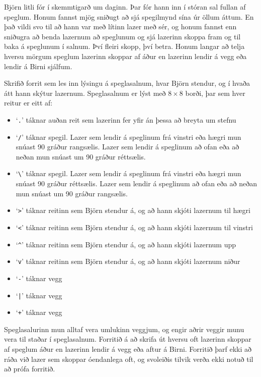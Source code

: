 
Björn litli fór í skemmtigarð um daginn. Þar fór hann inn í stóran sal fullan
af speglum. Honum fannst mjög sniðugt að sjá spegilmynd sína úr öllum áttum. En
það vildi svo til að hann var með lítinn lazer með sér, og honum fannst enn
sniðugra að benda lazernum að speglunum og sjá lazerinn skoppa fram og til baka
á speglunum í salnum. Því fleiri skopp, því betra. Honum langar að telja hversu
mörgum speglum lazerinn skoppar af áður en lazerinn lendir á vegg eða lendir á
Birni sjálfum.

Skrifið forrit sem les inn lýsingu á speglasalnum, hvar Björn stendur, og í
hvaða átt hann skýtur lazernum. Speglasalnum er lýst með $8\times 8$ borði, þar
sem hver reitur er eitt af:
\begin{itemize}
    \item `\texttt{.}' táknar auðan reit sem lazerinn fer yfir án þessa að breyta um stefnu
    \item `\texttt{/}' táknar spegil. Lazer sem lendir á speglinum frá vinstri eða hægri
    mun snúast 90 gráður rangsælis. Lazer sem lendir á speglinum að ofan eða að neðan mun snúast um 90 gráður réttsælis.
    \item `\texttt{\textbackslash}' táknar spegil. Lazer sem lendir á speglinum frá vinstri eða hægri
    mun snúast 90 gráður réttsælis. Lazer sem lendir á speglinum að ofan eða að neðan mun snúast um 90 gráður rangsælis.
    \vspace{10pt}
    \item `\texttt{>}' táknar reitinn sem Björn stendur á, og að hann skjóti lazernum til hægri
    \item `\texttt{<}' táknar reitinn sem Björn stendur á, og að hann skjóti lazernum til vinstri
    \item `\texttt{\^}' táknar reitinn sem Björn stendur á, og að hann skjóti lazernum upp
    \item `\texttt{v}' táknar reitinn sem Björn stendur á, og að hann skjóti lazernum niður
    \vspace{10pt}
    \item `\texttt{-}' táknar vegg
    \item `\texttt{|}' táknar vegg
    \item `\texttt{+}' táknar vegg
\end{itemize}
Speglasalurinn mun alltaf vera umlukinn veggjum, og engir aðrir veggir munu
vera til staðar í speglasalnum. Forritið á að skrifa út hversu oft lazerinn
skoppar af speglum áður en lazerinn lendir á vegg eða aftur á Birni. Forritið
þarf ekki að ráða við lazer sem skoppar óendanlega oft, og svoleiðis tilvik
verða ekki notuð til að prófa forritið.

